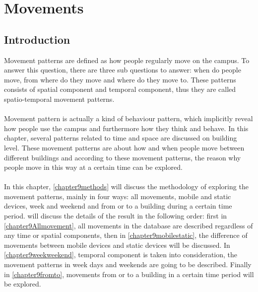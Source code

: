  \chapter{Movements}\label{movements}


\section{Introduction}
Movement patterns are defined as how people regularly move on the campus. To answer this question, there are three sub questions to answer: when do people move, from where do they move and where do they move to. These patterns consists of spatial component and temporal component, thus they are called spatio-temporal movement patterns.
\\\\
Movement pattern is actually a kind of behaviour pattern, which implicitly reveal how people use the campus and furthermore how they think and behave. In this chapter, several patterns related to time and space are discussed on building level. These movement patterns are about how and when people move between different buildings and according to these movement patterns, the reason why people move in this way at a certain time can be explored.
\\\\
In this chapter, \autoref{chapter9methods} will discuss the methodology of exploring the movement patterns, mainly in four ways: all movements, mobile and static devices, week and weekend and from or to a building during a certain time period.  will discuss the details of the result in the following order: first in \autoref{chapter9Allmovement}, all movements in the database are described regardless of any time or spatial components, then in \autoref{chapter9mobilestatic}, the difference of movements between mobile devices and static devices will be discussed. In \autoref{chapter9weekweekend}, temporal component is taken into consideration, the movement patterns in week days and weekends are going to be described. Finally in \autoref{chapter9fromto}, movements from or to a building in a certain time period will be explored. 

